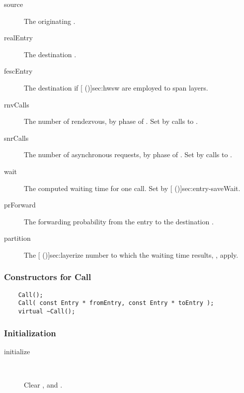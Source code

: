 \begin{description}
\item[source] \texonly{---} The originating .

\item[realEntry] \texonly{---} The destination .

\item[fescEntry] \texonly{---} The destination 
  if [ (\Sec\Ref)]{sec:hwsw} are
  employed to span layers.

\item[rnvCalls] \texonly{---} The number of rendezvous, by 
  phase of .  Set by calls to
  . 

\item[snrCalls] \texonly{---} The number of asynchronous requests, by
  phase of .  Set by calls to
  . 

\item[wait] \texonly{---} The computed waiting time for one call.  Set
  by [ (\Sec\Ref)]{sec:entry-saveWait}.

\item[prForward] \texonly{---} The forwarding probability from the
   entry to the destination .

\item[partition] \texonly{---} The [
  (\Sec\Ref)]{sec:layerize} number to which the waiting time results,
  , apply.
\end{description}

\subsubsection{Constructors for Call}

\begin{verbatim}
    Call();
    Call( const Entry * fromEntry, const Entry * toEntry );
    virtual ~Call();
\end{verbatim}

\subsubsection{Initialization}

\begin{description}
\item[initialize] \texonly{---} \\

Clear ,  and .

\end{description}

